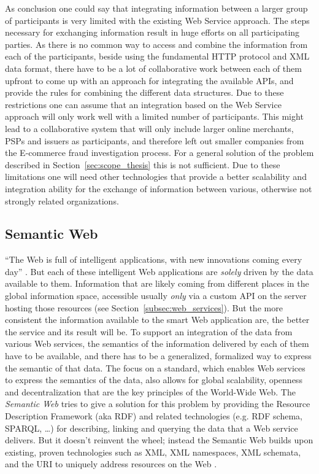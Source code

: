 As conclusion one could say that integrating information between a larger group of participants is very limited with the existing Web Service approach. The steps necessary for exchanging information result in huge efforts on all participating parties. As there is no common way to access and combine the information from each of the participants, beside using the fundamental \gls{HTTP} protocol and \gls{XML} data format, there have to be a lot of collaborative work between each of them upfront to come up with an approach for integrating the available \gls{API}s, and provide the rules for combining the different data structures. Due to these restrictions one can assume that an integration based on the Web Service approach will only work well with a limited number of participants. This might lead to a collaborative system that will only include larger online merchants, \gls{PSP}s and issuers as participants, and therefore left out smaller companies from the \gls{E-commerce} fraud investigation process. For a general solution of the problem described in Section~\ref{sec:scope_thesis} this is not sufficient. Due to these limitations one will need other technologies that provide a better scalability and integration ability for the exchange of information between various, otherwise not strongly related organizations.


\subsection{Semantic Web}
\label{subsec:web_data}

``The Web is full of intelligent applications, with new innovations coming every day'' \citep{allemang2011semantic}. But each of these intelligent Web applications are \emph{solely} driven by the data available to them. Information that are likely coming from different places in the global information space, accessible usually \emph{only} via a custom \gls{API} on the server hosting those resources (see Section~\ref{subsec:web_services}). But the more consistent the information available to the smart Web application are, the better the service and its result will be. To support an integration of the data from various Web services, the semantics of the information delivered by each of them have to be available, and there has to be a generalized, formalized way to express the semantic of that data. The focus on a standard, which enables Web services to express the semantics of the data, also allows for global scalability, openness and decentralization that are the key principles of the World-Wide Web. The \emph{Semantic Web} tries to give a solution for this problem by providing the Resource Description Framework (aka \gls{RDF}) and related technologies (e.g. RDF schema, \gls{SPARQL}, \ldots) for describing, linking and querying the data that a Web service delivers. But it doesn’t reinvent the wheel; instead the Semantic Web builds upon existing, proven technologies such as \gls{XML}, \gls{XML} namespaces, \gls{XML} schemata, and the \gls{URI} to uniquely address resources on the Web \citep{allemang2011semantic}. \\

